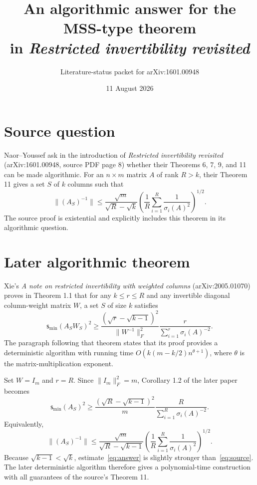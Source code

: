 \documentclass[11pt]{article}
\title{An algorithmic answer for the MSS-type theorem\\in \emph{Restricted invertibility revisited}}
\author{Literature-status packet for arXiv:1601.00948}
\date{11 August 2026}
\newcommand{\smin}{\mathsf{s}_{\min}}
\begin{document}
\maketitle

\section*{Source question}

Naor--Youssef ask in the introduction of
\emph{Restricted invertibility revisited} (arXiv:1601.00948, source PDF
page 8) whether their Theorems 6, 7, 9, and 11 can be made algorithmic.
For an $n\times m$ matrix $A$ of rank $R>k$, their Theorem 11 gives a
set $S$ of $k$ columns such that
\begin{equation}\label{eq:source}
 \|(A_S)^{-1}\|
 \le \frac{\sqrt m}{\sqrt R-\sqrt k}
 \left(\frac1R\sum_{i=1}^R\frac1{\sigma_i(A)^2}\right)^{1/2}.
\end{equation}
The source proof is existential and explicitly includes this theorem in
its algorithmic question.

\section*{Later algorithmic theorem}

Xie's \emph{A note on restricted invertibility with weighted columns}
(arXiv:2005.01070) proves in Theorem 1.1 that for any
$k\le r\le R$ and any invertible diagonal column-weight matrix $W$, a
set $S$ of size $k$ satisfies
\[
 \smin(A_SW_S)^2\ge
 \frac{(\sqrt r-\sqrt{k-1})^2}{\|W^{-1}\|_F^2}
 \frac{r}{\sum_{i=1}^r\sigma_i(A)^{-2}}.
\]
The paragraph following that theorem states that its proof provides a
deterministic algorithm with running time
$O(k(m-k/2)n^{\theta+1})$, where $\theta$ is the matrix-multiplication
exponent.

Set $W=I_m$ and $r=R$.  Since $\|I_m\|_F^2=m$, Corollary 1.2 of the
later paper becomes
\[
 \smin(A_S)^2\ge
 \frac{(\sqrt R-\sqrt{k-1})^2}{m}
 \frac{R}{\sum_{i=1}^R\sigma_i(A)^{-2}}.
\]
Equivalently,
\begin{equation}\label{eq:answer}
 \|(A_S)^{-1}\|
 \le \frac{\sqrt m}{\sqrt R-\sqrt{k-1}}
 \left(\frac1R\sum_{i=1}^R\frac1{\sigma_i(A)^2}\right)^{1/2}.
\end{equation}
Because $\sqrt{k-1}<\sqrt k$, estimate~\eqref{eq:answer} is slightly
stronger than~\eqref{eq:source}.  The later deterministic algorithm
therefore gives a polynomial-time construction with all guarantees of
the source's Theorem 11.
\end{document}
